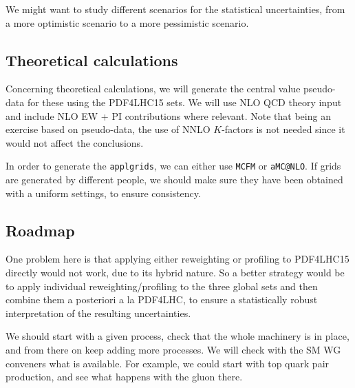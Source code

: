 We might want to study different scenarios for the statistical
uncertainties, from a more optimistic scenario to
a more pessimistic scenario.

\subsection{Theoretical calculations}

Concerning theoretical calculations, we will
generate the central value pseudo-data for these using the
PDF4LHC15 sets.
%
We will use NLO QCD
theory input and include NLO EW + PI contributions where relevant.
%
Note that being an exercise based on pseudo-data, the use of NNLO $K$-factors
is not needed since it would not affect the conclusions.

In order to generate the {\tt applgrids}, we can either use {\tt MCFM} or
{\tt aMC@NLO}.
%
If grids are generated by different people, we should make sure they have been
obtained with a uniform settings, to ensure consistency.

\subsection{Roadmap}

One problem here is that applying either reweighting or profiling to PDF4LHC15 directly
would not work, due to its hybrid nature.
%
So a better strategy would be to apply individual reweighting/profiling to the three
global sets and then combine them a posteriori a la PDF4LHC, to ensure a statistically
robust interpretation of the resulting uncertainties.

We should start with a given process, check that the whole machinery is in place, and
from there on keep adding more processes.
%
We will check with the SM WG conveners what is available.
%
For example, we could start with top quark pair production, and see what happens
with the gluon there.
